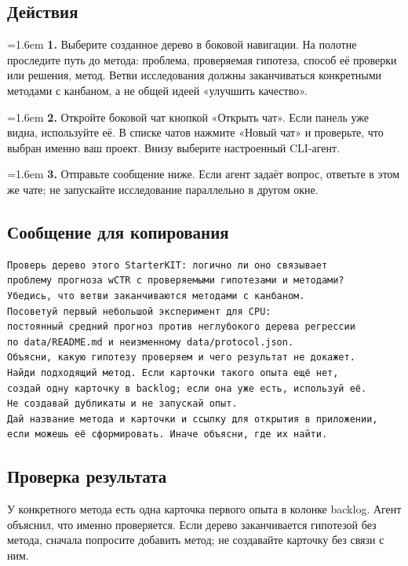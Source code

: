 \documentclass[10pt,a4paper]{article}
\begin{document}
\subsection*{Действия}
\par\noindent\hangindent=1.6em \textbf{1.} Выберите созданное дерево в боковой навигации. На полотне проследите путь до метода: проблема, проверяемая гипотеза, способ её проверки или решения, метод. Ветви исследования должны заканчиваться конкретными методами с канбаном, а не общей идеей «улучшить качество».\par
\par\noindent\hangindent=1.6em \textbf{2.} Откройте боковой чат кнопкой «Открыть чат». Если панель уже видна, используйте её. В списке чатов нажмите «Новый чат» и проверьте, что выбран именно ваш проект. Внизу выберите настроенный CLI-агент.\par
\par\noindent\hangindent=1.6em \textbf{3.} Отправьте сообщение ниже. Если агент задаёт вопрос, ответьте в этом же чате; не запускайте исследование параллельно в другом окне.\par
\subsection*{Сообщение для копирования}
\begin{promptbox}
\begin{Verbatim}
Проверь дерево этого StarterKIT: логично ли оно связывает
проблему прогноза wCTR с проверяемыми гипотезами и методами?
Убедись, что ветви заканчиваются методами с канбаном.
Посоветуй первый небольшой эксперимент для CPU:
постоянный средний прогноз против неглубокого дерева регрессии
по data/README.md и неизменному data/protocol.json.
Объясни, какую гипотезу проверяем и чего результат не докажет.
Найди подходящий метод. Если карточки такого опыта ещё нет,
создай одну карточку в backlog; если она уже есть, используй её.
Не создавай дубликаты и не запускай опыт.
Дай название метода и карточки и ссылку для открытия в приложении,
если можешь её сформировать. Иначе объясни, где их найти.
\end{Verbatim}
\end{promptbox}
\subsection*{Проверка результата}
У конкретного метода есть одна карточка первого опыта в колонке backlog. Агент объяснил, что именно проверяется. Если дерево заканчивается гипотезой без метода, сначала попросите добавить метод; не создавайте карточку без связи с ним.
\end{document}
